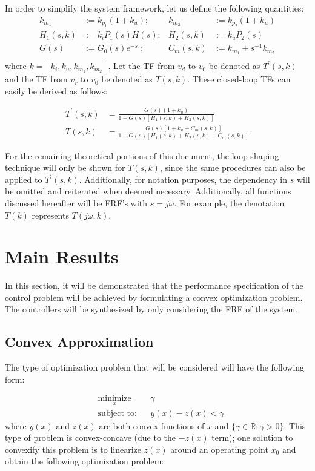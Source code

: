 \documentclass[a4paper, 10pt, conference]{ieeeconf}
\begin{document}
In order to simplify the system framework, let us define the following quantities:
\begin{equation} \label{eq:new_var}
\begin{aligned}
k_{m_1} &:= k_{p_1}(1+k_u) ;  &k_{m_2} &:= k_{p_2}(1+k_u)  \\
H_1(s,k) &:= k_iP_1(s)H(s);  &H_2(s,k) &:= k_uP_2(s) \\
G(s) &:= G_0(s)e^{-s\tau}; &C_m(s,k) &:= k_{m_1}+s^{-1}k_{m_2}\\ 
\end{aligned}
\end{equation}
where $k = [k_i,k_u,k_{m_1},k_{m_2}]$. Let the TF from $v_d$ to $v_0$ be denoted as $T^{\prime}(s,k)$ and the TF from $v_r$ to $v_0$ be denoted as $T(s,k)$. These closed-loop TFs can easily be derived as follows:

\begin{align}
T^{\prime}(s,k) &= \frac{G(s)(1+k_u)}{1+G(s)[H_1(s,k)+H_2(s,k)]} \label{eq:Tclp}  \\ 
T(s,k) &= \frac{G(s)[1+k_u+C_m(s,k)]}{1+G(s)[H_1(s,k)+H_2(s,k)+C_m(s,k)]}  \label{eq:Tcl} 
\end{align}

For the remaining theoretical portions of this document, the loop-shaping technique will only be shown for $T(s,k)$, since the same procedures can also be applied to $T^{\prime}(s,k)$. Additionally, for notation purposes, the dependency in $s$ will be omitted and reiterated when deemed necessary. Additionally, all functions discussed hereafter will be FRF's with $s = j\omega$. For example, the denotation $T(k)$ represents $T(j\omega,k)$.



\section{Main Results}
\label{sec:main}
In this section, it will be demonstrated that the performance specification of the control problem will be achieved by formulating a convex optimization problem. The controllers will be synthesized by only considering the FRF of the system.

\subsection{Convex Approximation}
The type of optimization problem that will be considered will have the following form:

\begin{equation} \label{eq:con_cav}
\begin{aligned}
& \underset{ x }{\text{minimize}}
& & \gamma  \\
& \text{subject to:} & & y(x)-z(x) < \gamma 
\end{aligned}
\end{equation}
where $y(x)$ and $z(x)$ are both convex functions of $x$ and $\{ \gamma \in \mathbb{R} : \gamma > 0\}$. This type of problem is convex-concave (due to the $-z(x)$ term); one solution to convexify this problem is to linearize $z(x)$ around an operating point $x_0$ and obtain the following optimization problem:
\end{document}
